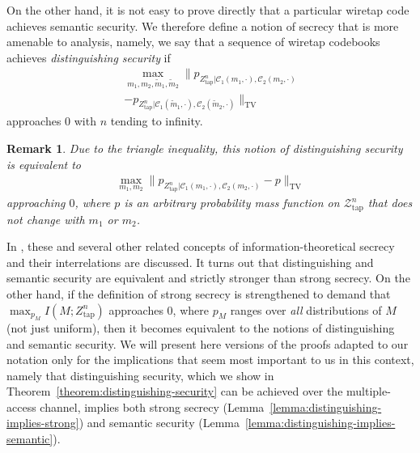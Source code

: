 \documentclass[journal]{IEEEtran}
\newcommand{\codebookpmf}{p}
\newcommand{\channelOut}{Z}
\newcommand{\channelOutAlph}{\mathcal{Z}}
\newcommand{\channelOutAlphWiretapper}{\channelOutAlph_\mathrm{tap}}
\newcommand{\channelOutWiretapper}{\channelOut_\mathrm{tap}}
\newcommand{\codebookOne}{\mathcal{C}_1}
\newcommand{\codebookTwo}{\mathcal{C}_2}
\newcommand{\codewordIndex}{m}
\newcommand{\codebookBlocklength}{n}
\newcommand{\mutualInformation}[2]{I(#1;#2)}
\newcommand{\totalvariation}[1]{\lVert #1 \rVert_\mathrm{TV}}
\newcommand{\messageRV}{M}
\newtheorem{remark}{Remark}
\begin{document}
On the other hand, it is not easy to prove directly that a particular wiretap code achieves semantic security. We therefore define a notion of secrecy that is more amenable to analysis, namely, we say that a sequence of wiretap codebooks achieves \emph{distinguishing security}  if
\begin{multline}
\label{def:distinguishing-security}
\max\limits_{\codewordIndex_1, \codewordIndex_2, \tilde{\codewordIndex}_1, \tilde{\codewordIndex}_2}
  \totalvariation{
    \codebookpmf_{\channelOutWiretapper^\codebookBlocklength | \codebookOne(\codewordIndex_1, \cdot), \codebookTwo(\codewordIndex_2, \cdot)}
    \\
    -
    \codebookpmf_{\channelOutWiretapper^\codebookBlocklength | \codebookOne(\tilde{\codewordIndex}_1, \cdot), \codebookTwo(\tilde{\codewordIndex}_2, \cdot)}
  }
\end{multline}
approaches $0$ with $\codebookBlocklength$ tending to infinity.
\begin{remark}
Due to the triangle inequality, this notion of distinguishing security is equivalent to
\begin{align*}
\max\limits_{\codewordIndex_1, \codewordIndex_2}
  \totalvariation{
    \codebookpmf_{\channelOutWiretapper^\codebookBlocklength | \codebookOne(\codewordIndex_1, \cdot), \codebookTwo(\codewordIndex_2, \cdot)}
    -
    \codebookpmf
  }
\end{align*}
approaching $0$, where $\codebookpmf$ is an arbitrary probability mass function on $\channelOutAlphWiretapper^\codebookBlocklength$ that does not change with $\codewordIndex_1$ or $\codewordIndex_2$.
\end{remark}

In \cite{BellareCryptographic}, these and several other related concepts of information-theoretical secrecy and their interrelations are discussed. It turns out that distinguishing and semantic security are equivalent and strictly stronger than strong secrecy. On the other hand, if the definition of strong secrecy is strengthened to demand that $\max_{\codebookpmf_\messageRV} \mutualInformation{\messageRV}{\channelOutWiretapper^\codebookBlocklength}$ approaches $0$, where $\codebookpmf_\messageRV$ ranges over \emph{all} distributions of $\messageRV$ (not just uniform), then it becomes equivalent to the notions of distinguishing and semantic security. We will present here versions of the proofs adapted to our notation only for the implications that seem most important to us in this context, namely that distinguishing security, which we show in Theorem~\ref{theorem:distinguishing-security} can be achieved over the multiple-access channel, implies both strong secrecy (Lemma~\ref{lemma:distinguishing-implies-strong}) and semantic security (Lemma~\ref{lemma:distinguishing-implies-semantic}).
\end{document}

